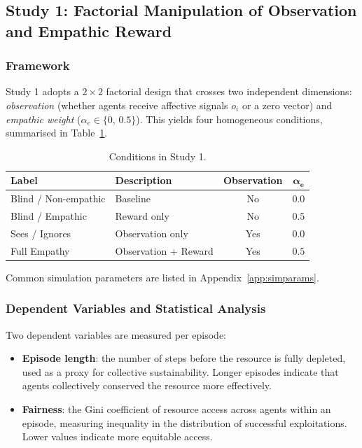 \subsection{Study 1: Factorial Manipulation of Observation and Empathic Reward}

\subsubsection{Framework}

Study 1 adopts a $2\times2$ factorial design that crosses two independent
dimensions: \emph{observation} (whether agents receive affective signals
$o_i$ or a zero vector) and \emph{empathic weight}
($\alpha_e \in \{0,\, 0.5\}$). This yields four homogeneous conditions,
summarised in Table~\ref{tab:conditions}.

\begin{table}[h]
\centering
\begin{tabular}{llcc}
\hline
\textbf{Label} & \textbf{Description} & \textbf{Observation} & $\boldsymbol{\alpha_e}$ \\
\hline
Blind / Non-empathic & Baseline             & No  & $0.0$ \\
Blind / Empathic     & Reward only          & No  & $0.5$ \\
Sees / Ignores       & Observation only     & Yes & $0.0$ \\
Full Empathy         & Observation + Reward & Yes & $0.5$ \\
\hline
\end{tabular}
\caption{Conditions in Study 1.}
\label{tab:conditions}
\end{table}

Common simulation parameters are listed in Appendix~\ref{app:simparams}.

\subsubsection{Dependent Variables and Statistical Analysis}

Two dependent variables are measured per episode:
\begin{itemize}
    \item \textbf{Episode length}: the number of steps before the resource
          is fully depleted, used as a proxy for collective sustainability.
          Longer episodes indicate that agents collectively conserved the
          resource more effectively.
    \item \textbf{Fairness}: the Gini coefficient of resource access across
          agents within an episode, measuring inequality in the distribution
          of successful exploitations. Lower values indicate more equitable
          access.
\end{itemize}

